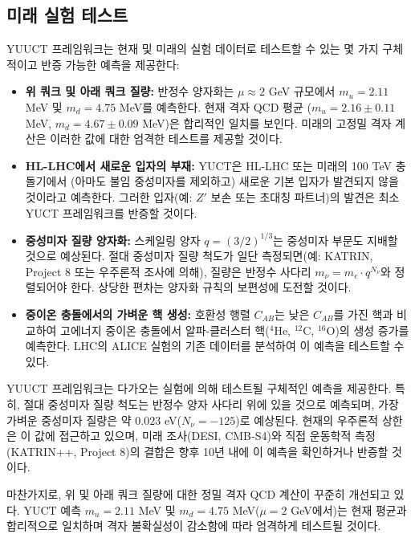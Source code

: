 \documentclass[11pt,a4paper]{article}
\begin{document}
	\subsection{미래 실험 테스트}
	
	YUUCT 프레임워크는 현재 및 미래의 실험 데이터로 테스트할 수 있는 몇 가지 구체적이고 반증 가능한 예측을 제공한다:
	
	\begin{itemize}
		\item \textbf{위 쿼크 및 아래 쿼크 질량:} 반정수 양자화는 $\mu \approx 2$ GeV 규모에서 $m_u = 2.11$ MeV 및 $m_d = 4.75$ MeV를 예측한다. 현재 격자 QCD 평균 \cite{PDG2024}($m_u = 2.16 \pm 0.11$ MeV, $m_d = 4.67 \pm 0.09$ MeV)은 합리적인 일치를 보인다. 미래의 고정밀 격자 계산은 이러한 값에 대한 엄격한 테스트를 제공할 것이다.
		
		\item \textbf{HL-LHC에서 새로운 입자의 부재:} YUCT은 HL-LHC 또는 미래의 100 TeV 충돌기에서 (아마도 불임 중성미자를 제외하고) 새로운 기본 입자가 발견되지 않을 것이라고 예측한다. 그러한 입자(예: $Z'$ 보손 또는 초대칭 파트너)의 발견은 최소 YUCT 프레임워크를 반증할 것이다.
		
		\item \textbf{중성미자 질량 양자화:} 스케일링 양자 $q = (3/2)^{1/3}$는 중성미자 부문도 지배할 것으로 예상된다. 절대 중성미자 질량 척도가 일단 측정되면(예: KATRIN, Project 8 또는 우주론적 조사에 의해), 질량은 반정수 사다리 $m_\nu = m_e \cdot q^{N_\nu}$와 정렬되어야 한다. 상당한 편차는 양자화 규칙의 보편성에 도전할 것이다.
		
		\item \textbf{중이온 충돌에서의 가벼운 핵 생성:} 호환성 행렬 $C_{AB}$는 낮은 $C_{AB}$를 가진 핵과 비교하여 고에너지 중이온 충돌에서 알파-클러스터 핵($^4$He, $^{12}$C, $^{16}$O)의 생성 증가를 예측한다. LHC의 ALICE 실험의 기존 데이터를 분석하여 이 예측을 테스트할 수 있다.
	\end{itemize}
	
	YUUCT 프레임워크는 다가오는 실험에 의해 테스트될 구체적인 예측을 제공한다. 특히, 절대 중성미자 질량 척도는 반정수 양자 사다리 위에 있을 것으로 예측되며, 가장 가벼운 중성미자 질량은 약 $0.023$ eV($N_\nu = -125$)로 예상된다. 현재의 우주론적 상한은 이 값에 접근하고 있으며, 미래 조사(DESI, CMB‑S4)와 직접 운동학적 측정(KATRIN++, Project 8)의 결합은 향후 10년 내에 이 예측을 확인하거나 반증할 것이다.
	
	마찬가지로, 위 및 아래 쿼크 질량에 대한 정밀 격자 QCD 계산이 꾸준히 개선되고 있다. YUCT 예측 $m_u = 2.11$ MeV 및 $m_d = 4.75$ MeV($\mu = 2$ GeV에서)는 현재 평균과 합리적으로 일치하며 격자 불확실성이 감소함에 따라 엄격하게 테스트될 것이다.
	
\end{document}
